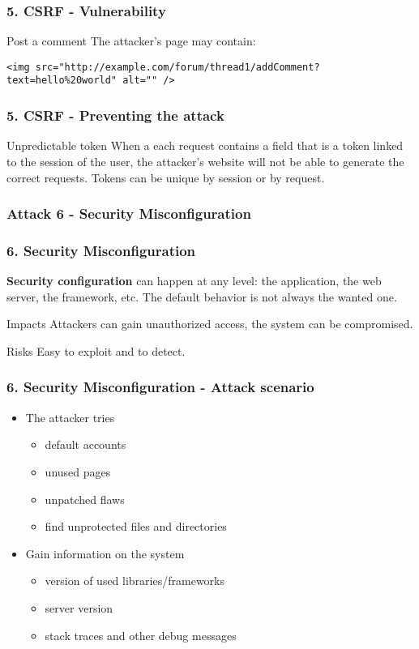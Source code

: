 \begin{frame}[fragile]
\frametitle{5. CSRF - Vulnerability}
\begin{exampleblock}{Post a comment}
The attacker's page may contain:
\begin{lstlisting}
<img src="http://example.com/forum/thread1/addComment?
text=hello%20world" alt="" />
\end{lstlisting}
\end{exampleblock}
\end{frame}

\begin{frame}[fragile]
\frametitle{5. CSRF - Preventing the attack}
\begin{block}{Unpredictable token}
When a each request contains a field that is a token linked to the session of
the user, the attacker's website will not be able to generate the correct
requests.
Tokens can be unique by session or by request.
\end{block}
\end{frame}

\subsubsection{Attack 6 - Security Misconfiguration}

\begin{frame}
\frametitle{6. Security Misconfiguration}
\textbf{Security configuration} can happen at any level: the application, the
web server, the framework, etc.
The default behavior is not always the wanted one.
\begin{block}{Impacts}
Attackers can gain unauthorized access, the system can be compromised.
\end{block}
\begin{block}{Risks}
\alert{Easy} to exploit and to detect.
\end{block}
\end{frame}

\begin{frame}
\frametitle{6. Security Misconfiguration - Attack scenario}
\begin{itemize}
\item The attacker tries
	\begin{itemize}
	\item default accounts
	\item unused pages
	\item unpatched flaws
	\item find unprotected files and directories
	\end{itemize}
\item Gain information on the system
	\begin{itemize}
	\item version of used libraries/frameworks
	\item server version
	\item stack traces and other debug messages
	\end{itemize}
\end{itemize}
\end{frame}

